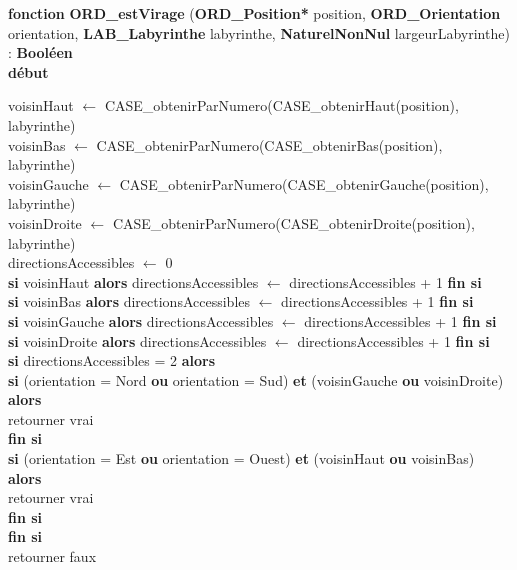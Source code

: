 \documentclass[a4paper, 11pt]{article}
\begin{document}
\noindent\textbf{fonction} \textbf{ORD\_estVirage} (\textbf{ORD\_Position*} position, \textbf{ORD\_Orientation} orientation, \textbf{LAB\_Labyrinthe} labyrinthe, \textbf{NaturelNonNul} largeurLabyrinthe) : \textbf{Booléen}\\
\textbf{début}
\begin{flushleft}
    \hspace*{1cm}voisinHaut $\gets$ CASE\_obtenirParNumero(CASE\_obtenirHaut(position), labyrinthe)\\
    \hspace*{1cm}voisinBas $\gets$ CASE\_obtenirParNumero(CASE\_obtenirBas(position), labyrinthe)\\
    \hspace*{1cm}voisinGauche $\gets$ CASE\_obtenirParNumero(CASE\_obtenirGauche(position), labyrinthe)\\
    \hspace*{1cm}voisinDroite $\gets$ CASE\_obtenirParNumero(CASE\_obtenirDroite(position), labyrinthe)\\
    \hspace*{1cm}directionsAccessibles $\gets$ 0\\
    \hspace*{1cm}\textbf{si} voisinHaut \textbf{alors} directionsAccessibles $\gets$ directionsAccessibles + 1 \textbf{fin si}\\
    \hspace*{1cm}\textbf{si} voisinBas \textbf{alors} directionsAccessibles $\gets$ directionsAccessibles + 1 \textbf{fin si}\\
    \hspace*{1cm}\textbf{si} voisinGauche \textbf{alors} directionsAccessibles $\gets$ directionsAccessibles + 1 \textbf{fin si}\\
    \hspace*{1cm}\textbf{si} voisinDroite \textbf{alors} directionsAccessibles $\gets$ directionsAccessibles + 1 \textbf{fin si}\\
    \hspace*{1cm}\textbf{si} directionsAccessibles = 2 \textbf{alors}\\
    \hspace*{2cm}\textbf{si} (orientation = Nord \textbf{ou} orientation = Sud) \textbf{et} (voisinGauche \textbf{ou} voisinDroite) \textbf{alors}\\
    \hspace*{3cm}retourner vrai\\
    \hspace*{2cm}\textbf{fin si}\\
    \hspace*{2cm}\textbf{si} (orientation = Est \textbf{ou} orientation = Ouest) \textbf{et} (voisinHaut \textbf{ou} voisinBas) \textbf{alors}\\
    \hspace*{3cm}retourner vrai\\
    \hspace*{2cm}\textbf{fin si}\\
    \hspace*{1cm}\textbf{fin si}\\
    \hspace*{1cm}retourner faux
\end{flushleft}
\end{document}
